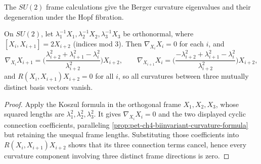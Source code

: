 The $SU(2)$ frame calculations give the Berger curvature eigenvalues and their
degeneration under the Hopf fibration.

\begin{example}
  \label{ex:pet-ch4-general-berger-metric}

  On $SU(2)$, let $\lambda_1^{-1}X_1,\lambda_2^{-1}X_2,\lambda_3^{-1}X_3$ be
  orthonormal, where $[X_i,X_{i+1}]=2X_{i+2}$ (indices mod $3$). Then
  $\nabla_{X_i}X_i=0$ for each $i$, and
  \[
    \nabla_{X_i}X_{i+1}=\Big(\frac{\lambda_{i+2}^2+\lambda_{i+1}^2-\lambda_i^2}{\lambda_{i+2}^2}\Big)X_{i+2},
    \qquad
    \nabla_{X_{i+1}}X_i=\Big(\frac{-\lambda_{i+2}^2+\lambda_{i+1}^2-\lambda_i^2}{\lambda_{i+2}^2}\Big)X_{i+2},
  \]
  and $R(X_i,X_{i+1})X_{i+2}=0$ for all $i$, so all curvatures between three
  mutually distinct basis vectors vanish.
\end{example}
\begin{proof}
  \sketch
  Apply the Koszul formula in the orthogonal frame $X_1,X_2,X_3$, whose squared
  lengths are $\lambda_1^2,\lambda_2^2,\lambda_3^2$. It gives
  $\nabla_{X_i}X_i=0$ and the two displayed cyclic connection coefficients,
  paralleling \cref{prop:pet-ch4-biinvariant-curvature-formula} but retaining
  the unequal frame lengths. Substituting those coefficients into
  $R(X_i,X_{i+1})X_{i+2}$ shows that its three connection terms cancel, hence
  every curvature component involving three distinct frame directions is zero.
\end{proof}


